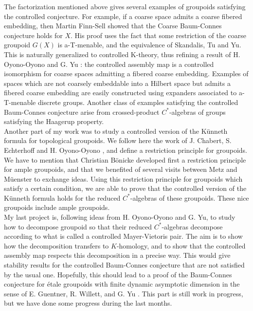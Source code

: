 The factorization mentioned above gives several examples of groupoids satisfying the controlled conjecture. For example, if a coarse space admits a coarse fibered embedding, then Martin Finn-Sell showed \cite{FinnSellFibred} that the Coarse Baum-Connes conjecture holds for $X$. His proof uses the fact that some restriction of the coarse groupoid $G(X)$ is a-T-menable, and the equivalence of Skandalis, Tu and Yu. This is naturally generalized to controlled K-theory, thus refining a result of H. Oyono-Oyono and G. Yu \cite{OY3}: the controlled assembly map is a controlled isomorphism for coarse spaces admitting a fibered coarse embedding. Examples of spaces which are not coarsely embeddable into a Hilbert space but admits a fibered coarse embedding are easily constructed using expanders associated to a-T-menable discrete groups. Another class of examples satisfying the controlled Baum-Connes conjecture arise from crossed-product $C^*$-algebras of groups satisfying the Haagerup property. \\

Another part of my work was to study a controlled version of the Künneth formula for topological groupoids. We follow here the work of J. Chabert, S. Echterhoff and H. Oyono-Oyono \cite{ChabertEchtOy}, and define a  restriction principle for groupoids. We have to mention that Christian Bönicke developed first a restriction principle for ample groupoids, and that we benefited of several visits between Metz and Müenster to exchange ideas. Using this restriction principle for groupoids which satisfy a certain condition, we are able to prove that the controlled version of the Künneth formula holds for the reduced $C^*$-algebras of these groupoids. These nice groupoids include ample groupoids.\\

My last project is, following ideas from H. Oyono-Oyono and G. Yu, to study how to decompose groupoid so that their reduced $C^*$-algebras decompose according to what is called a controlled Mayer-Vietoris pair. The aim is to show how the decomposition transfers to $K$-homology, and to show that the controlled assembly map respects this decomposition in a precise way. This would give stability results for the controlled Baum-Connes conjecture that are not satisfied by the usual one. Hopefully, this should lead to a proof of the Baum-Connes conjecture for étale groupoids with finite dynamic asymptotic dimension in the sense of E. Guentner, R. Willett, and G. Yu \cite{GWY}.  This part is still work in progress, but we have done some progress during the last months.\\

